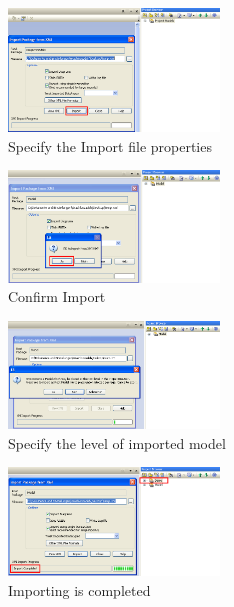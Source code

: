 \begin{enumerate}
\begin{figure}[htbp]
\begin{center}
  \includegraphics[width=0.5\textwidth]{pics/tricks/projectMigration/projectMigration4}
  \caption{Specify the Import file properties}  
  \label{fig_projectMigration04}
\end{center}
\end{figure}


\begin{figure}[htbp]
\begin{center}
  \includegraphics[width=0.5\textwidth]{pics/tricks/projectMigration/projectMigration5}
  \caption{Confirm Import}  
  \label{fig_projectMigration05}
\end{center}
\end{figure}



\begin{figure}[htbp]
\begin{center}
  \includegraphics[width=0.5\textwidth]{pics/tricks/projectMigration/projectMigration6}
  \caption{Specify the level of imported model}  
  \label{fig_projectMigration06}
\end{center}
\end{figure}


\begin{figure}[htbp]
\begin{center}
  \includegraphics[width=0.5\textwidth]{pics/tricks/projectMigration/projectMigration7}
  \caption{Importing is completed}  
  \label{fig_projectMigration07}
\end{center}
\end{figure}


\end{enumerate}

